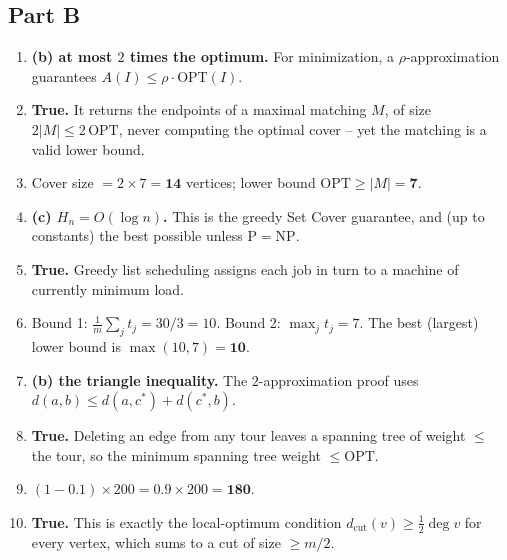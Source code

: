 \documentclass[11pt]{article}
\begin{document}
\subsection*{Part B}

\begin{enumerate}[label=\textbf{B\arabic*.}, leftmargin=2.2em]

\item \textbf{(b) at most $2$ times the optimum.} For minimization, a $\rho$-approximation
guarantees $A(I) \le \rho\cdot\mathrm{OPT}(I)$.

\item \textbf{True.} It returns the endpoints of a maximal matching $M$, of size $2|M| \le
2\,\mathrm{OPT}$, never computing the optimal cover -- yet the matching is a valid lower
bound.

\item Cover size $= 2 \times 7 = \mathbf{14}$ vertices; lower bound $\mathrm{OPT} \ge |M|
= \mathbf{7}$.

\item \textbf{(c) $H_n = O(\log n)$.} This is the greedy Set Cover guarantee, and (up to
constants) the best possible unless $\mathrm{P}=\mathrm{NP}$.

\item \textbf{True.} Greedy list scheduling assigns each job in turn to a machine of
currently minimum load.

\item Bound 1: $\frac1m\sum_j t_j = 30/3 = 10$. Bound 2: $\max_j t_j = 7$. The best
(largest) lower bound is $\max(10, 7) = \mathbf{10}$.

\item \textbf{(b) the triangle inequality.} The $2$-approximation proof uses $d(a,b) \le
d(a,c^\ast) + d(c^\ast,b)$.

\item \textbf{True.} Deleting an edge from any tour leaves a spanning tree of weight $\le$
the tour, so the minimum spanning tree weight $\le \mathrm{OPT}$.

\item $(1 - 0.1)\times 200 = 0.9 \times 200 = \mathbf{180}$.

\item \textbf{True.} This is exactly the local-optimum condition $d_{\text{cut}}(v) \ge
\frac12\deg v$ for every vertex, which sums to a cut of size $\ge m/2$.

\end{enumerate}
\end{document}

